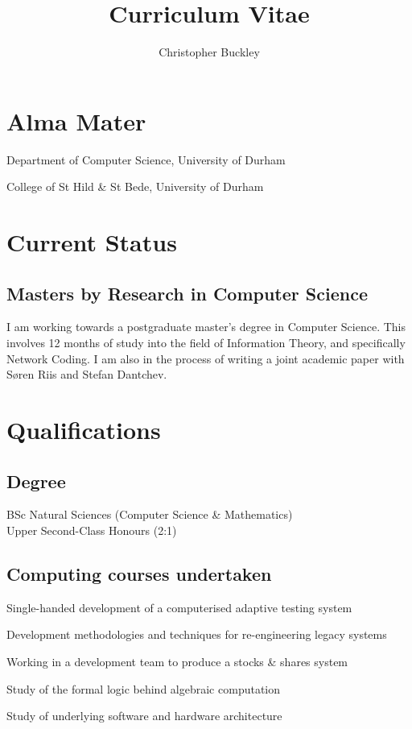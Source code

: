 \documentclass{cv}
\title{Curriculum Vitae}
\author{Christopher Buckley}
\begin{document}
\section{Alma Mater}

\begin{description}[leftmargin=!,labelwidth=\widthof{\bfseries 2006--present}]
\item[2006--present] Department of Computer Science, University of Durham
\item[2003--2006] College of St Hild \& St Bede, University of Durham
\end{description}

\section{Current Status}

\subsection*{Masters by Research in Computer Science}

I am working towards a postgraduate master's degree in Computer Science. This involves 12 months of study into the field of Information Theory, and specifically Network Coding. I am also in the process of writing a joint academic paper with S{\o}ren Riis and Stefan Dantchev.

\section{Qualifications}

\subsection*{Degree}

BSc Natural Sciences (Computer Science \& Mathematics)\\
Upper Second-Class Honours (2:1)

\subsection*{Computing courses undertaken}

\begin{description}[style=nextline]
\item[Computer science project] Single-handed development of a computerised adaptive testing system
\item[Software Engineering] Development methodologies and techniques for re-engineering legacy systems
\item[Group project] Working in a development team to produce a stocks \& shares system
\item[Formal Aspects] Study of the formal logic behind algebraic computation
\item[Computer Systems] Study of underlying software and hardware architecture
\end{description}
\end{document}

